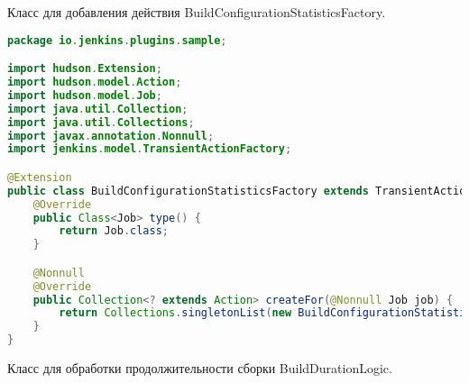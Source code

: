 Класс для добавления действия BuildConfigurationStatisticsFactory.

\begin{lstlisting}[language=Java]
package io.jenkins.plugins.sample;

import hudson.Extension;
import hudson.model.Action;
import hudson.model.Job;
import java.util.Collection;
import java.util.Collections;
import javax.annotation.Nonnull;
import jenkins.model.TransientActionFactory;

@Extension
public class BuildConfigurationStatisticsFactory extends TransientActionFactory<Job> {
    @Override
    public Class<Job> type() {
        return Job.class;
    }

    @Nonnull
    @Override
    public Collection<? extends Action> createFor(@Nonnull Job job) {
        return Collections.singletonList(new BuildConfigurationStatisticsAction(job));
    }
}

\end{lstlisting}

Класс для обработки продолжительности сборки BuildDurationLogic.

